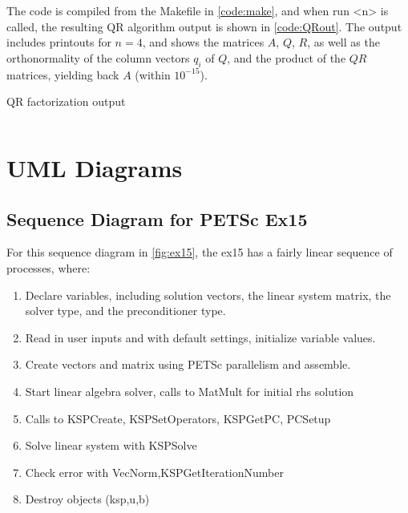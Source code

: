 \documentclass[12pt,letterpaper]{article}
\newenvironment{longlisting}{\captionsetup{type=listing}}{}
\newcommand{\code}[4]{
\begin{longlisting}
    \caption{#3}
    \inputminted{#1}{#2}
    \label{code:#4}
\end{longlisting}
}
\begin{document}
The code is compiled from the Makefile in \cref{code:make}, and when run <n> is called, the resulting QR algorithm output is shown in \cref{code:QRout}. The output includes printouts for $n=4$, and shows the matrices $A$, $Q$, $R$, as well as the orthonormality of the column vectors $q_i$ of $Q$, and the product of the $QR$ matrices, yielding back $A$ (within $10^{-15}$).

\code{python}{figures/pde.txt}{QR factorization output}{QRout}



\newpage
\section{UML Diagrams}

\subsection{Sequence Diagram for PETSc Ex15}
For this sequence diagram in \cref{fig:ex15}, the ex15 has a fairly linear sequence of processes, where:
\begin{enumerate}
  \item Declare variables, including solution vectors, the linear system matrix, the solver type, and the preconditioner type.
  \item Read in user inputs and with default settings, initialize variable values.
  \item Create vectors and matrix using PETSc parallelism and assemble.
  \item Start linear algebra solver, calls to MatMult for initial rhs solution
  \item Calls to KSPCreate, KSPSetOperators, KSPGetPC, PCSetup
  \item Solve linear system with KSPSolve
  \item Check error with VecNorm,KSPGetIterationNumber
  \item Destroy objects (ksp,u,b)
\end{enumerate}
\end{document}
